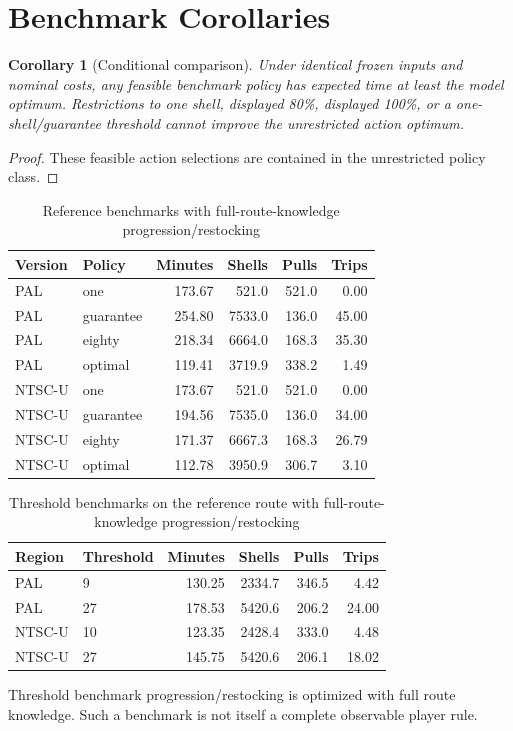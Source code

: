 \documentclass[11pt]{article}
\newtheorem{corollary}[theorem]{Corollary}
\theoremstyle{definition}\newtheorem{definition}[theorem]{Definition}
\begin{document}
\section{Benchmark Corollaries}
\begin{corollary}[Conditional comparison]
Under identical frozen inputs and nominal costs, any feasible benchmark policy has expected time at least the model optimum. Restrictions to one shell, displayed 80\%, displayed 100\%, or a one-shell/guarantee threshold cannot improve the unrestricted action optimum.
\end{corollary}
\begin{proof}
These feasible action selections are contained in the unrestricted policy class.
\end{proof}
\begin{table}[H]\centering\small
\begin{tabular}{llrrrr}\toprule
Version & Policy & Minutes & Shells & Pulls & Trips\\\midrule
PAL & one & 173.67 & 521.0 & 521.0 & 0.00\\
PAL & guarantee & 254.80 & 7533.0 & 136.0 & 45.00\\
PAL & eighty & 218.34 & 6664.0 & 168.3 & 35.30\\
PAL & optimal & 119.41 & 3719.9 & 338.2 & 1.49\\
NTSC-U & one & 173.67 & 521.0 & 521.0 & 0.00\\
NTSC-U & guarantee & 194.56 & 7535.0 & 136.0 & 34.00\\
NTSC-U & eighty & 171.37 & 6667.3 & 168.3 & 26.79\\
NTSC-U & optimal & 112.78 & 3950.9 & 306.7 & 3.10\\
\bottomrule\end{tabular}
\caption{Reference benchmarks with full-route-knowledge progression/restocking}\label{tab:result-2}\end{table}

\begin{table}[H]\centering\small
\begin{tabular}{llrrrr}\toprule
Region & Threshold & Minutes & Shells & Pulls & Trips\\\midrule
PAL & 9 & 130.25 & 2334.7 & 346.5 & 4.42\\
PAL & 27 & 178.53 & 5420.6 & 206.2 & 24.00\\
NTSC-U & 10 & 123.35 & 2428.4 & 333.0 & 4.48\\
NTSC-U & 27 & 145.75 & 5420.6 & 206.1 & 18.02\\
\bottomrule\end{tabular}
\caption{Threshold benchmarks on the reference route with full-route-knowledge progression/restocking}\label{tab:result-3}\end{table}
Threshold benchmark progression/restocking is optimized with full route knowledge. Such a benchmark is not itself a complete observable player rule.
\end{document}
